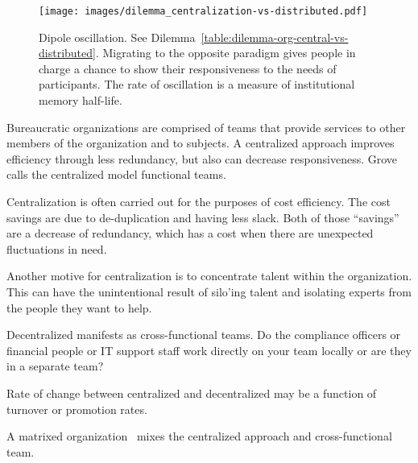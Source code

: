 \begin{figure}[H] %
    \centering
    \texttt{[image: images/dilemma\_centralization-vs-distributed.pdf]}
    \caption{Dipole oscillation. See Dilemma~\ref{table:dilemma-org-central-vs-distributed}. Migrating to the opposite paradigm gives people in charge a chance to show their responsiveness to the needs of participants. The rate of oscillation is a measure of institutional memory half-life.}
    \label{fig:central-vs-distributed}
\end{figure}

Bureaucratic organizations are comprised of teams that provide services to other members of the organization and to subjects. A centralized approach improves efficiency through less redundancy, but also can decrease responsiveness.  
Grove~\cite{1995_Grove} calls the centralized model functional teams.


Centralization is often carried out for the purposes of cost efficiency. The cost savings are due to de-duplication and having less slack. Both of those ``savings'' are a decrease of redundancy, which has a cost when there are unexpected fluctuations in need. 

Another motive for centralization is to concentrate talent within the organization. This can have the unintentional result of silo'ing talent and isolating experts from the people they want to help.

Decentralized manifests as cross-functional teams. Do the compliance officers or financial people or IT support staff work directly on your team locally or are they in a separate team?

Rate of change between centralized and decentralized may be a function of turnover or promotion rates. 

A matrixed organization~\cite{1985_NASA} mixes the centralized approach and cross-functional team.



